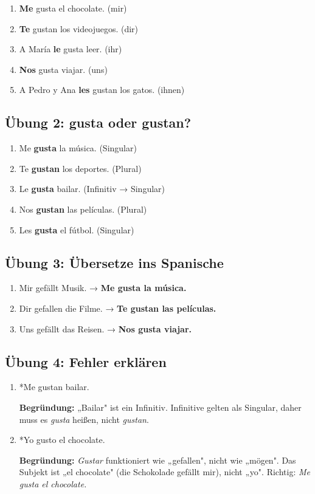 \documentclass[10pt, a4paper]{article}
\newcommand{\es}[1]{\textcolor{spanisch}{\textit{#1}}}
\newcommand{\loesung}[1]{\textcolor{success}{\textbf{#1}}}
\begin{document}
\begin{enumerate}[nosep, leftmargin=2em]
    \item \loesung{Me} gusta el chocolate. (mir)
    \item \loesung{Te} gustan los videojuegos. (dir)
    \item A María \loesung{le} gusta leer. (ihr)
    \item \loesung{Nos} gusta viajar. (uns)
    \item A Pedro y Ana \loesung{les} gustan los gatos. (ihnen)
\end{enumerate}

\subsection*{Übung 2: gusta oder gustan?}

\begin{enumerate}[nosep, leftmargin=2em]
    \item Me \loesung{gusta} la música. (Singular)
    \item Te \loesung{gustan} los deportes. (Plural)
    \item Le \loesung{gusta} bailar. (Infinitiv → Singular)
    \item Nos \loesung{gustan} las películas. (Plural)
    \item Les \loesung{gusta} el fútbol. (Singular)
\end{enumerate}

\subsection*{Übung 3: Übersetze ins Spanische}

\begin{enumerate}[nosep, leftmargin=2em]
    \item Mir gefällt Musik. → \loesung{Me gusta la música.}
    \item Dir gefallen die Filme. → \loesung{Te gustan las películas.}
    \item Uns gefällt das Reisen. → \loesung{Nos gusta viajar.}
\end{enumerate}

\subsection*{Übung 4: Fehler erklären}

\begin{enumerate}[nosep, leftmargin=2em]
    \item \textcolor{fehler}{*Me gustan bailar.}

    \loesung{Begründung:} „Bailar" ist ein Infinitiv. Infinitive gelten als Singular, daher muss es \es{gusta} heißen, nicht \es{gustan}.

    \item \textcolor{fehler}{*Yo gusto el chocolate.}

    \loesung{Begründung:} \es{Gustar} funktioniert wie „gefallen", nicht wie „mögen". Das Subjekt ist „el chocolate" (die Schokolade gefällt mir), nicht „yo". Richtig: \es{Me gusta el chocolate.}
\end{enumerate}
\end{document}
